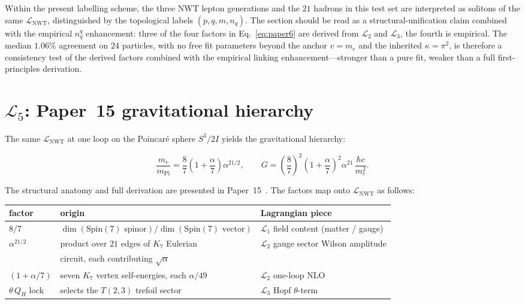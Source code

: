 \documentclass[11pt]{article}
\newcommand{\spinL}{\mathrm{Spin}}
\newcommand{\Lnwt}{\mathcal{L}_\text{NWT}}
\begin{document}
\medskip

Within the present labelling scheme, the three NWT lepton
generations and the $21$ hadrons in this test set are interpreted
as solitons of the same $\Lnwt$, distinguished by the topological
labels $(p, q, m, n_q)$.  The section should be read as a
structural-unification claim combined with the empirical $n_q^q$
enhancement: three of the four factors in
Eq.~\ref{eq:paper6} are derived from $\mathcal{L}_2$ and
$\mathcal{L}_3$, the fourth is empirical.  The median $1.06\%$
agreement on $24$ particles, with no free fit parameters beyond the
anchor $v = m_e$ and the inherited $\kappa = \pi^2$, is therefore a
consistency test of the derived factors combined with the empirical
linking enhancement---stronger than a pure fit, weaker than a full
first-principles derivation.

\section{$\mathcal{L}_5$: Paper~15 gravitational hierarchy}
\label{sec:L5}

The same $\Lnwt$ at one loop on the Poincar\'e sphere $S^3/2I$
yields the gravitational hierarchy:

\begin{equation}
\label{eq:gravity}
  \frac{m_e}{m_\text{Pl}}
    =  \frac{8}{7}\left(1 + \frac{\alpha}{7}\right) \alpha^{21/2} ,
  \qquad
  G  =  \left(\frac{8}{7}\right)^2 \left(1 + \frac{\alpha}{7}\right)^2
        \alpha^{21}\,\frac{\hbar c}{m_e^2} .
\end{equation}

The structural anatomy and full derivation are presented in
Paper~15~\cite{paper15}.  The factors map onto $\Lnwt$ as follows:

\begin{table}[H]
\centering
\renewcommand{\arraystretch}{1.2}
\begin{tabular}{lll}
\toprule
\textbf{factor} & \textbf{origin} & \textbf{Lagrangian piece} \\
\midrule
$8/7$ & $\dim(\spinL(7)\text{ spinor}) / \dim(\spinL(7)\text{ vector})$ &
$\mathcal{L}_1$ field content (matter / gauge) \\
$\alpha^{21/2}$ & product over $21$ edges of $K_7$ Eulerian &
$\mathcal{L}_2$ gauge sector Wilson amplitude \\
& circuit, each contributing $\sqrt{\alpha}$ & \\
$(1 + \alpha/7)$ & seven $K_7$ vertex self-energies, each $\alpha/49$ &
$\mathcal{L}_2$ one-loop NLO \\
$\theta\,Q_H$ lock & selects the $T(2,3)$ trefoil sector &
$\mathcal{L}_3$ Hopf $\theta$-term \\
\bottomrule
\end{tabular}
\end{table}
\end{document}
